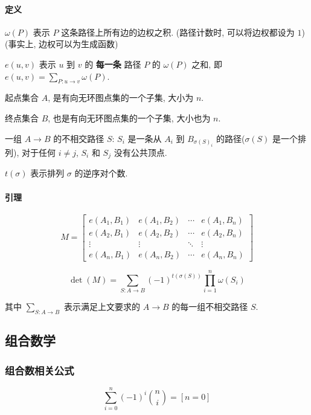 \paragraph{定义}

\(\omega(P)\) 表示 \(P\) 这条路径上所有边的边权之积. (路径计数时, 可以将边权都设为 \(1\)) (事实上, 边权可以为生成函数)

\(e(u, v)\) 表示 \(u\) 到 \(v\) 的 \textbf{每一条} 路径 \(P\) 的 \(\omega(P)\) 之和, 即 \(e(u, v)=\sum\limits_{P:u\rightarrow v}\omega(P)\).

起点集合 \(A\), 是有向无环图点集的一个子集, 大小为 \(n\).

终点集合 \(B\), 也是有向无环图点集的一个子集, 大小也为 \(n\).

一组 \(A\rightarrow B\) 的不相交路径 \(S\): \(S_i\) 是一条从 \(A_i\) 到 \(B_{\sigma(S)_i}\) 的路径(\(\sigma(S)\) 是一个排列), 对于任何 \(i\ne j\), \(S_i\) 和 \(S_j\) 没有公共顶点.

\(t(\sigma)\) 表示排列 \(\sigma\) 的逆序对个数.

\paragraph{引理}

\[
    M = \begin{bmatrix}
        e(A_1,B_1) & e(A_1,B_2) & \cdots & e(A_1,B_n) \\
        e(A_2,B_1) & e(A_2,B_2) & \cdots & e(A_2,B_n) \\
        \vdots     & \vdots     & \ddots & \vdots     \\
        e(A_n,B_1) & e(A_n,B_2) & \cdots & e(A_n,B_n)
    \end{bmatrix}
\]

\[
    \det(M)=\sum\limits_{S:A\rightarrow B}(-1)^{t(\sigma(S))}\prod\limits_{i=1}^n \omega(S_i)
\]

其中 \(\sum\limits_{S:A\rightarrow B}\) 表示满足上文要求的 \(A\rightarrow B\) 的每一组不相交路径 \(S\).

\subsection{组合数学}

\subsubsection{组合数相关公式}

\begin{equation}
    \sum_{i=0}^n(-1)^i\binom{n}{i}=[n=0]
\end{equation}

